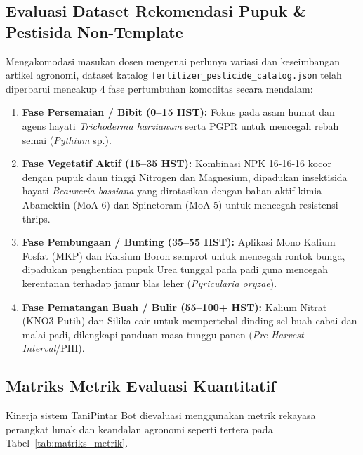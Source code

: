 \documentclass[11pt,a4paper]{article}
\begin{document}
\subsection{Evaluasi Dataset Rekomendasi Pupuk \& Pestisida Non-Template}
Mengakomodasi masukan dosen mengenai perlunya variasi dan keseimbangan artikel agronomi, dataset katalog \texttt{fertilizer\_pesticide\_catalog.json} telah diperbarui mencakup 4 fase pertumbuhan komoditas secara mendalam:
\begin{enumerate}
    \item \textbf{Fase Persemaian / Bibit (0--15 HST):} Fokus pada asam humat dan agens hayati \textit{Trichoderma harzianum} serta PGPR untuk mencegah rebah semai (\textit{Pythium} sp.).
    \item \textbf{Fase Vegetatif Aktif (15--35 HST):} Kombinasi NPK 16-16-16 kocor dengan pupuk daun tinggi Nitrogen dan Magnesium, dipadukan insektisida hayati \textit{Beauveria bassiana} yang dirotasikan dengan bahan aktif kimia Abamektin (MoA 6) dan Spinetoram (MoA 5) untuk mencegah resistensi thrips.
    \item \textbf{Fase Pembungaan / Bunting (35--55 HST):} Aplikasi Mono Kalium Fosfat (MKP) dan Kalsium Boron semprot untuk mencegah rontok bunga, dipadukan penghentian pupuk Urea tunggal pada padi guna mencegah kerentanan terhadap jamur blas leher (\textit{Pyricularia oryzae}).
    \item \textbf{Fase Pematangan Buah / Bulir (55--100+ HST):} Kalium Nitrat (KNO3 Putih) dan Silika cair untuk mempertebal dinding sel buah cabai dan malai padi, dilengkapi panduan masa tunggu panen (\textit{Pre-Harvest Interval}/PHI).
\end{enumerate}

\subsection{Matriks Metrik Evaluasi Kuantitatif}
Kinerja sistem TaniPintar Bot dievaluasi menggunakan metrik rekayasa perangkat lunak dan keandalan agronomi seperti tertera pada Tabel~\ref{tab:matriks_metrik}.
\end{document}
